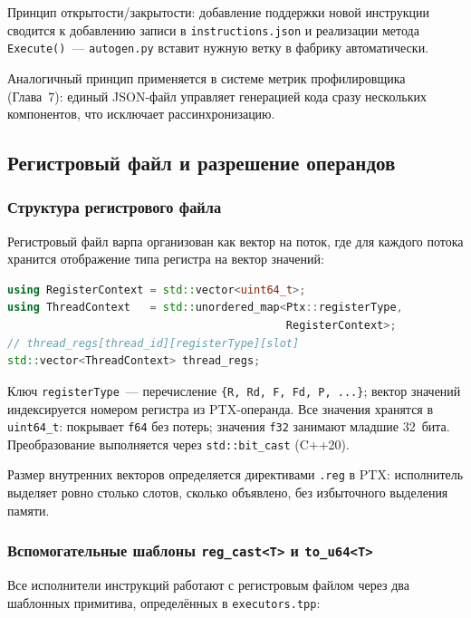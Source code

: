 Принцип открытости/закрытости: добавление поддержки новой инструкции
сводится к добавлению записи
в \texttt{instructions.json} и реализации метода \texttt{Execute()}~---
\texttt{autogen.py} вставит нужную ветку в фабрику автоматически.

Аналогичный принцип применяется в системе метрик профилировщика (Глава~7):
единый JSON-файл управляет генерацией кода сразу нескольких компонентов,
что исключает рассинхронизацию.

\subsection{Регистровый файл и разрешение операндов}

\subsubsection{Структура регистрового файла}

Регистровый файл варпа организован как вектор на поток,
где для каждого потока хранится отображение типа регистра
на вектор значений:

\begin{lstlisting}[language=C++, caption={Структура регистрового файла}]
using RegisterContext = std::vector<uint64_t>;
using ThreadContext   = std::unordered_map<Ptx::registerType,
                                           RegisterContext>;
// thread_regs[thread_id][registerType][slot]
std::vector<ThreadContext> thread_regs;
\end{lstlisting}

Ключ \texttt{registerType}~--- перечисление \texttt{\{R, Rd, F, Fd, P, ...\}};
вектор значений индексируется номером регистра из PTX-операнда.
Все значения хранятся в \texttt{uint64\_t}: покрывает \texttt{f64}
без потерь; значения \texttt{f32} занимают младшие 32~бита.
Преобразование выполняется через \texttt{std::bit\_cast} (C++20).

Размер внутренних векторов определяется директивами \texttt{.reg}
в PTX: исполнитель выделяет ровно столько слотов, сколько объявлено,
без избыточного выделения памяти.

\subsubsection{Вспомогательные шаблоны \texttt{reg\_cast<T>} и \texttt{to\_u64<T>}}

Все исполнители инструкций работают с регистровым файлом через два
шаблонных примитива, определённых в \texttt{executors.tpp}:

